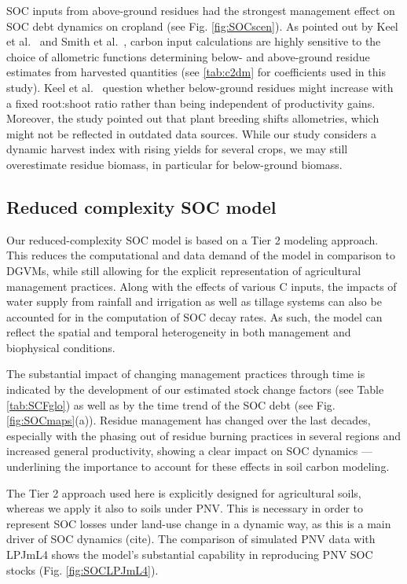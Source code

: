 \documentclass[gc, manuscript]{copernicus}
\begin{document}
SOC inputs from above-ground residues had the strongest management effect on SOC debt dynamics on cropland (see Fig. \ref{fig:SOCscen}). As pointed out by Keel et al.~\citeyearpar{keel_large_2017} and Smith et al.~\citeyearpar{smith_how_2020}, carbon input calculations are highly sensitive to the choice of allometric functions determining below- and above-ground residue estimates from harvested quantities (see \ref{tab:c2dm} for coefficients used in this study). Keel et al.~\citeyearpar{keel_large_2017} question whether below-ground residues might increase with a fixed root:shoot ratio rather than being independent of productivity gains. Moreover, the study pointed out that plant breeding shifts allometries, which might not be reflected in outdated data sources. While our study considers a dynamic harvest index with rising yields for several crops, we may still overestimate residue biomass, in particular for below-ground biomass.

\hypertarget{reduced-complexity-soc-model}{%
\subsection{Reduced complexity SOC model}\label{reduced-complexity-soc-model}}

Our reduced-complexity SOC model is based on a Tier 2 modeling approach. This reduces the computational and data demand of the model in comparison to DGVMs, while still allowing for the explicit representation of agricultural management practices. Along with the effects of various C inputs, the impacts of water supply from rainfall and irrigation as well as tillage systems can also be accounted for in the computation of SOC decay rates. As such, the model can reflect the spatial and temporal heterogeneity in both management and biophysical conditions.

The substantial impact of changing management practices through time is indicated by the development of our estimated stock change factors (see Table \ref{tab:SCFglo}) as well as by the time trend of the SOC debt (see Fig. \ref{fig:SOCmaps}(a)). Residue management has changed over the last decades, especially with the phasing out of residue burning practices in several regions and increased general productivity, showing a clear impact on SOC dynamics --- underlining the importance to account for these effects in soil carbon modeling.

The Tier 2 approach \citep{ogle_cropland_in_ipcc_2019} used here is explicitly designed for agricultural soils, whereas we apply it also to soils under PNV. This is necessary in order to represent SOC losses under land-use change in a dynamic way, as this is a main driver of SOC dynamics (cite). The comparison of simulated PNV data with LPJmL4 shows the model's substantial capability in reproducing PNV SOC stocks (Fig. \ref{fig:SOCLPJmL4}).
\end{document}
